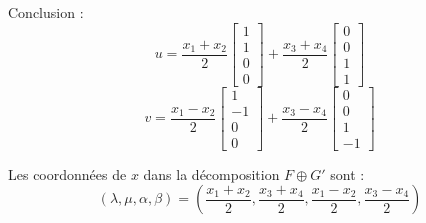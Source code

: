 \documentclass[10pt,a4paper]{article}
\begin{document}
Conclusion :
\[
u = \frac{x_1 + x_2}{2} \begin{bmatrix} 1 \\ 1 \\ 0 \\ 0 \end{bmatrix} + \frac{x_3 + x_4}{2} \begin{bmatrix} 0 \\ 0 \\ 1 \\ 1 \end{bmatrix}
\]
\[
v = \frac{x_1 - x_2}{2} \begin{bmatrix} 1 \\ -1 \\ 0 \\ 0 \end{bmatrix} + \frac{x_3 - x_4}{2} \begin{bmatrix} 0 \\ 0 \\ 1 \\ -1 \end{bmatrix}
\]

Les coordonnées de \( x \) dans la décomposition \( F \oplus G' \) sont :
\[
(\lambda, \mu, \alpha, \beta) = \left( \frac{x_1 + x_2}{2}, \frac{x_3 + x_4}{2}, \frac{x_1 - x_2}{2}, \frac{x_3 - x_4}{2} \right)
\]
\end{document}
